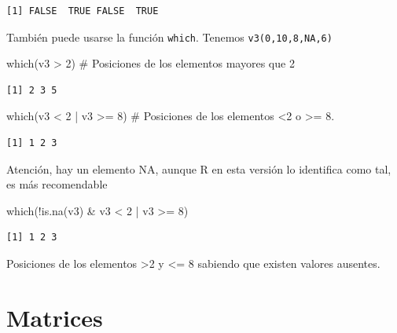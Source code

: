 \documentclass[
  letterpaper,
]{scrbook}
\newenvironment{Shaded}{\begin{snugshade}}{\end{snugshade}}
\newcommand{\CommentTok}[1]{\textcolor[rgb]{0.37,0.37,0.37}{#1}}
\newcommand{\DecValTok}[1]{\textcolor[rgb]{0.68,0.00,0.00}{#1}}
\newcommand{\FunctionTok}[1]{\textcolor[rgb]{0.28,0.35,0.67}{#1}}
\newcommand{\NormalTok}[1]{\textcolor[rgb]{0.00,0.23,0.31}{#1}}
\newcommand{\SpecialCharTok}[1]{\textcolor[rgb]{0.37,0.37,0.37}{#1}}
\begin{document}
\begin{verbatim}
[1] FALSE  TRUE FALSE  TRUE
\end{verbatim}

También puede usarse la función \texttt{which}. Tenemos
\texttt{v3(0,10,8,NA,6)}

\begin{Shaded}
\begin{Highlighting}[]
\FunctionTok{which}\NormalTok{(v3 }\SpecialCharTok{\textgreater{}} \DecValTok{2}\NormalTok{) }\CommentTok{\# Posiciones de los elementos mayores que 2}
\end{Highlighting}
\end{Shaded}

\begin{verbatim}
[1] 2 3 5
\end{verbatim}

\begin{Shaded}
\begin{Highlighting}[]
\FunctionTok{which}\NormalTok{(v3 }\SpecialCharTok{\textless{}} \DecValTok{2} \SpecialCharTok{|}\NormalTok{ v3 }\SpecialCharTok{\textgreater{}=} \DecValTok{8}\NormalTok{) }\CommentTok{\# Posiciones de los elementos \textless{}2 o \textgreater{}= 8.  }
\end{Highlighting}
\end{Shaded}

\begin{verbatim}
[1] 1 2 3
\end{verbatim}

Atención, hay un elemento NA, aunque R en esta versión lo identifica
como tal, es más recomendable

\begin{Shaded}
\begin{Highlighting}[]
\FunctionTok{which}\NormalTok{(}\SpecialCharTok{!}\FunctionTok{is.na}\NormalTok{(v3) }\SpecialCharTok{\&}\NormalTok{ v3 }\SpecialCharTok{\textless{}} \DecValTok{2} \SpecialCharTok{|}\NormalTok{ v3 }\SpecialCharTok{\textgreater{}=} \DecValTok{8}\NormalTok{) }
\end{Highlighting}
\end{Shaded}

\begin{verbatim}
[1] 1 2 3
\end{verbatim}

Posiciones de los elementos \textgreater2 y \textless= 8 sabiendo que
existen valores ausentes.

\hypertarget{matrices}{%
\section{Matrices}\label{matrices}}
\end{document}
